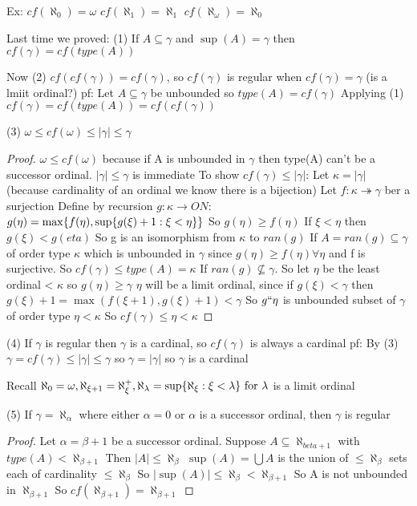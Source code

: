 Ex: $cf(\aleph_0) = \omega$
$cf(\aleph_1) = \aleph_1$
$cf(\aleph_\omega)=\aleph_0$

Last time we proved:
(1) If $A \subseteq \gamma$ and $\sup(A) = \gamma$ then $cf(\gamma) = cf(type(A))$

Now
(2) $cf(cf(\gamma)) = cf(\gamma)$, so $cf(\gamma)$ is regular when $cf(\gamma) = \gamma$ (is a lmiit ordinal?)
pf:
    Let $A \subseteq \gamma$ be unbounded so $type(A) = cf(\gamma)$
    Applying (1) $cf(\gamma) = cf(type(A)) = cf(cf(\gamma))$


(3) $\omega \leq cf(\omega) \leq |\gamma| \leq \gamma$
\begin{proof}
    $\omega \leq cf(\omega)$ because if A is unbounded in $\gamma$ then type(A) can't be a successor ordinal.
    $|\gamma| \leq \gamma$ is immediate
    To show $cf(\gamma) \leq |\gamma|$:
    Let $\kappa = |\gamma|$ (because cardinality of an ordinal we know there is a bijection)
    Let $f: \kappa \twoheadrightarrow \gamma$ ber a surjection
    Define by recursion $g : \kappa \rightarrow ON$:
    $g(\eta) = \max\{f(\eta), \sup\{g(\xi) + 1 : \xi < \eta\}\}$
    So $g(\eta) \geq f(\eta)$
    If $\xi < \eta$ then $g(\xi) < g(eta)$
    So g is an isomorphism from $\kappa$ to $ran(g)$
    If $A = ran(g) \subseteq \gamma$ of order type $\kappa$ which is unbounded in $\gamma$ since $g(\eta) \geq f(\eta) \forall \eta$ and f is surjective.
    So $cf(\gamma) \leq type(A) = \kappa$
    If $ran(g) \nsubseteq \gamma$.
    So let $\eta$ be the least ordinal < $\kappa$ so $g(\eta) \geq \gamma$
    $\eta$ will be a limit ordinal, since if $g(\xi) < \gamma$ then $g(\xi) + 1 = \max(f(\xi+1), g(\xi)+1) < \gamma$
    So $g``\eta$ is unbounded subset of $\gamma$ of order type $\eta < \kappa$
    So $cf(\gamma) \leq \eta < \kappa$

\end{proof}

(4) If $\gamma$ is regular then $\gamma$ is a cardinal, so $cf(\gamma)$ is always a cardinal
pf:
    By (3) $\gamma = cf(\gamma) \leq |\gamma| \leq \gamma$ so $\gamma = |\gamma|$ so $\gamma$ is a cardinal

Recall $\aleph_0 = \omega, \aleph_{\xi + 1} = \aleph_\xi^+, \aleph_\lambda = \sup\{\aleph_\xi : \xi < \lambda\} \text{ for } \lambda$  is a limit ordinal

(5) If $\gamma = \aleph_\alpha$ where either $\alpha = 0$ or $\alpha$ is a successor ordinal, then $\gamma$ is regular
\begin{proof}
    Let $\alpha = \beta + 1$ be a successor ordinal.
    Suppose $A \subseteq \aleph_{beta+1} $ with $type(A) < \aleph_{\beta + 1}$
    Then $|A| \leq \aleph_\beta$
    $\sup(A) = \bigcup A$ is the union of $\leq \aleph_\beta$ sets each of cardinality $\leq \aleph_\beta$
    So $|\sup(A)| \leq \aleph_\beta < \aleph_{\beta+1}$
    So A is not unbounded in $\aleph_{\beta + 1}$
    So $cf(\aleph_{\beta + 1}) = \aleph_{\beta + 1}$
\end{proof}

